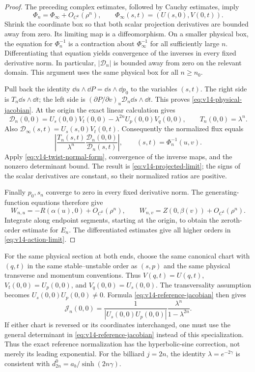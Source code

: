 \begin{proof}
The preceding complex estimates, followed by Cauchy estimates, imply
\[
 \Phi_n=\Phi_\infty+O_{C^k}(\rho^n),\qquad
 \Phi_\infty(s,t)=(U(s,0),V(0,t)).
\]
Shrink the coordinate box so that both scalar projection derivatives
are bounded away from zero. Its limiting map is a diffeomorphism.
On a smaller physical box, the equation for $\Phi_n^{-1}$ is a
contraction about $\Phi_\infty^{-1}$ for all sufficiently large $n$.
Differentiating that equation yields convergence of the inverses in
every fixed derivative norm. In particular, $|\mathcal D_n|$ is bounded
away from zero on the relevant domain. This argument uses the same
physical box for all $n\ge n_0$.

Pull back the identity $\dd u\wedge\dd P=\dd s\wedge\dd p_0$
to the variables $(s,t)$. The right side is
$T_n\dd s\wedge\dd t$; the left side is
$(\partial P/\partial v)_u\mathcal D_n\dd s\wedge\dd t$.
This proves \eqref{eq:v14-physical-jacobian}. At the origin the exact
linear calculation gives
\begin{equation}\label{eq:v14-reference-jacobian}
 \mathcal D_n(0,0)=U_s(0,0)V_t(0,0)
             -\lambda^{2n}U_p(0,0)V_q(0,0),\qquad T_n(0,0)=\lambda^n.
\end{equation}
Also $\mathcal D_\infty(s,t)=U_s(s,0)V_t(0,t)$. Consequently the
normalized flux equals
\[
 \left|\frac{T_n(s,t)}{\lambda^n}
             \frac{\mathcal D_n(0,0)}{\mathcal D_n(s,t)}\right|,
 \qquad (s,t)=\Phi_n^{-1}(u,v).
\]
Apply \eqref{eq:v14-twist-normal-form}, convergence of the inverse maps,
and the nonzero determinant bound. The result is
\eqref{eq:v14-projected-limit}; the signs of the scalar derivatives
are constant, so their normalized ratios are positive.

Finally $p_0,s_n$ converge to zero in every fixed derivative norm.
The generating-function equations therefore give
\[
 W_{n,u}=-R(\alpha(u),0)+O_{C^k}(\rho^n),\qquad
 W_{n,v}= Z(0,\beta(v))+O_{C^k}(\rho^n).
\]
Integrate along endpoint segments, starting at the origin, to obtain
the zeroth-order estimate for $E_n$. The differentiated estimates give
all higher orders in \eqref{eq:v14-action-limit}.
\end{proof}

For the same physical section at both ends, choose the same canonical
chart with $(q,t)$ in the same stable--unstable order as $(s,p)$ and the
same physical transverse and momentum conventions. Thus
$V(q,t)=U(q,t)$, $V_t(0,0)=U_p(0,0)$, and
$V_q(0,0)=U_s(0,0)$. The transversality assumption becomes
$U_s(0,0)U_p(0,0)\ne0$. Formula
\eqref{eq:v14-reference-jacobian} then gives
\[
 \mathcal J_n(0,0)=
 \frac{1}{|U_s(0,0)U_p(0,0)|}
                       \frac{\lambda^n}{1-\lambda^{2n}}.
\]
If either chart is reversed or its coordinates interchanged, one must
use the general determinant in \eqref{eq:v14-reference-jacobian}
instead of this specialization. Thus the exact reference normalization has the hyperbolic-sine
correction, not merely its leading exponential. For the billiard
$j=2n$, the identity $\lambda=e^{-2\gamma}$ is consistent with
$d_{2n}^0=a_b/\sinh(2n\gamma)$.

